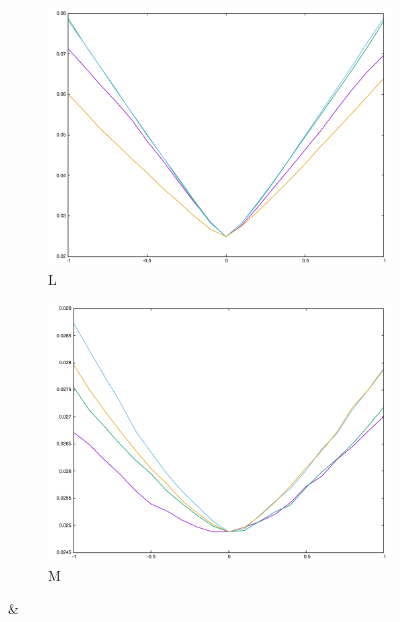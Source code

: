 \begin{figure}[H]
\begin{subfigure}{.33\textwidth}
\end{subfigure}\\
\begin{subfigure}{.33\textwidth}
	\includegraphics[width=\linewidth]{fig/ajherr/t3/L_mae.pdf}
	\caption{L}
\end{subfigure}%
\begin{subfigure}{.33\textwidth}
	\includegraphics[width=\linewidth]{fig/ajherr/t3/M_mae.pdf}
	\caption{M}
\end{subfigure}&
\begin{subfigure}{.33\textwidth}

\end{subfigure}
\end{figure}

